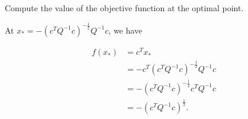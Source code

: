 Compute the value of the objective function at the optimal point.

\begin{solution}
    At $x_* = -\left( c^T Q^{-1} c \right)^{-\frac{1}{2}} Q^{-1} c$, we have

    \begin{align*}
        f(x_*) &= c^T x_* \\
               &= - c^T \left( c^T Q^{-1} c \right)^{-\frac{1}{2}} Q^{-1} c \\
               &= -\left( c^T Q^{-1} c \right)^{-\frac{1}{2}} c^T Q^{-1} c \\
               &= -\left( c^T Q^{-1} c \right)^{\frac{1}{2}}.
    \end{align*}

    \ \\
\end{solution}